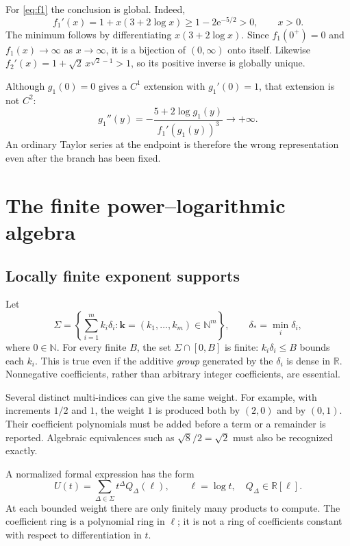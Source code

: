 \documentclass[11pt,a4paper]{article}
\numberwithin{equation}{section}
\theoremstyle{definition}\newtheorem{definition}[theorem]{Definition}
\theoremstyle{remark}\newtheorem{remark}[theorem]{Remark}
\newcommand{\R}{\mathbb R}\newcommand{\C}{\mathbb C}\newcommand{\N}{\mathbb N}
\newcommand{\e}{\mathrm e}
\begin{document}
For \cref{eq:f1} the conclusion is global. Indeed,
\begin{equation}
 f_1'(x)=1+x(3+2\log x)\ge 1-2\e^{-5/2}>0,
 \qquad x>0.
 \label{eq:global-slope}
\end{equation}
The minimum follows by differentiating $x(3+2\log x)$. Since $f_1(0^+)=0$
and $f_1(x)\to\infty$ as $x\to\infty$, it is a bijection of $(0,\infty)$
onto itself. Likewise $f_2'(x)=1+\sqrt2\,x^{\sqrt2-1}>1$, so its positive
inverse is globally unique.

Although $g_1(0)=0$ gives a $C^1$ extension with $g_1'(0)=1$, that
extension is not $C^2$:
\[
 g_1''(y)=-\frac{5+2\log g_1(y)}{f_1'(g_1(y))^3}\longrightarrow+\infty.
\]
An ordinary Taylor series at the endpoint is therefore the wrong
representation even after the branch has been fixed.

\section{The finite power--logarithmic algebra}
\label{sec:algebra}

\subsection{Locally finite exponent supports}

Let
\begin{equation}
 \Sigma=\left\{\sum_{i=1}^m k_i\delta_i:
          \bm k=(k_1,\ldots,k_m)\in\N^m\right\},
 \qquad \delta_* =\min_i\delta_i,
 \label{eq:semigroup}
\end{equation}
where $0\in\N$. For every finite $B$, the set $\Sigma\cap[0,B]$ is finite:
$k_i\delta_i\le B$ bounds each $k_i$. This is true even if the additive
\emph{group} generated by the $\delta_i$ is dense in $\R$. Nonnegative
coefficients, rather than arbitrary integer coefficients, are essential.

Several distinct multi-indices can give the same weight. For example,
with increments $1/2$ and $1$, the weight $1$ is produced both by $(2,0)$
and by $(0,1)$. Their coefficient polynomials must be added before a term
or a remainder is reported. Algebraic equivalences such as
$\sqrt8/2=\sqrt2$ must also be recognized exactly.

A normalized formal expression has the form
\begin{equation}
 U(t)=\sum_{\Delta\in\Sigma}t^\Delta Q_\Delta(\ell),
 \qquad \ell=\log t,\quad Q_\Delta\in\R[\ell].
 \label{eq:formal-algebra}
\end{equation}
At each bounded weight there are only finitely many products to compute.
The coefficient ring is a polynomial ring in $\ell$; it is not a ring of
coefficients constant with respect to differentiation in $t$.
\end{document}
